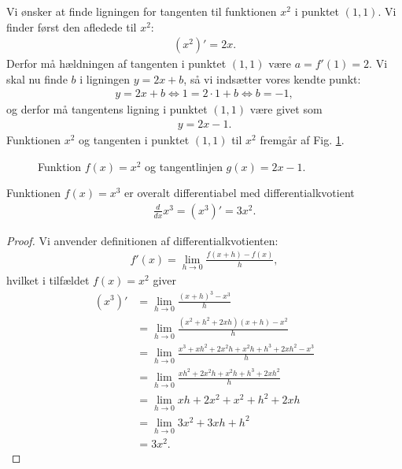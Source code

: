 \begin{exa}
Vi ønsker at finde ligningen for tangenten til funktionen $x^2$ i punktet $(1,1)$. Vi finder først den afledede til $x^2$:
\begin{align*}
(x^2)' = 2x.
\end{align*}
Derfor må hældningen af tangenten i punktet $(1,1)$ være $a = f'(1) = 2$. Vi skal nu finde $b$ i ligningen $y=2x+b$, så vi indsætter vores kendte punkt:
\begin{align*}
y = 2x+b \Leftrightarrow 1= 2\cdot 1 +b \Leftrightarrow b = -1,
\end{align*}
og derfor må tangentens ligning i punktet $(1,1)$ være givet som
\begin{align*}
y = 2x-1.
\end{align*}
Funktionen $x^2$ og tangenten i punktet $(1,1)$ til $x^2$ fremgår af Fig. \ref{fig:tangent}.

\begin{figure}[H]
	\centering
	\caption{Funktion $f(x)=x^2$ og tangentlinjen $g(x) = 2x-1$.}
	\label{fig:tangent}
\end{figure}
\end{exa}

\begin{setn}
Funktionen $f(x)=x^3$ er overalt differentiabel med differentialkvotient
\begin{align*}
\frac{d}{dx}x^3 = (x^3)' = 3x^2. 
\end{align*}
\end{setn}
\begin{proof}
Vi anvender definitionen af differentialkvotienten:
\begin{align*}
f'(x) = \lim_{h\to 0}\frac{f(x+h)-f(x)}{h},
\end{align*}
hvilket i tilfældet $f(x) = x^2$ giver
\begin{align*}
(x^3)' &= \lim_{h\to 0}\frac{(x+h)^3-x^3}{h}\\
&= \lim_{h\to 0} \frac{(x^2+h^2+2xh)(x+h)-x^2}{h}\\
&= \lim_{h\to 0} \frac{x^3+xh^2+2x^2h+x^2h+h^3+2xh^2-x^3}{h}\\
&= \lim_{h\to 0} \frac{xh^2+2x^2h+x^2h+h^3+2xh^2}{h}\\
&= \lim_{h\to 0} xh+2x^2+x^2+h^2+2xh\\
&= \lim_{h\to 0} 3x^2+3xh+h^2\\
&= 3x^2.
\end{align*}
\end{proof}

